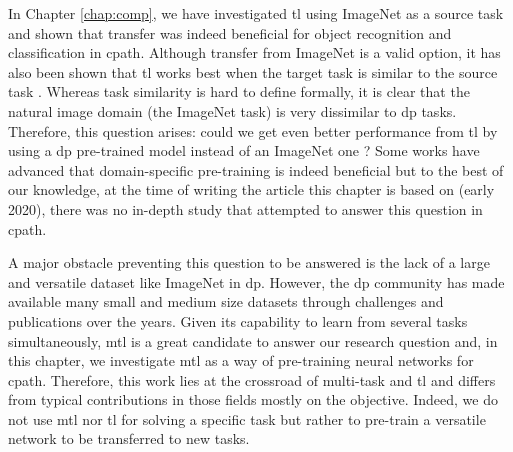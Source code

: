 
In Chapter \ref{chap:comp}, we have investigated \acrlong{tl} using ImageNet \cite{deng2009imagenet} as a source task and shown that transfer was indeed beneficial for object recognition and classification in \acrlong{cpath}. Although transfer from ImageNet is a valid option, it has also been shown that \acrlong{tl} works best when the target task is similar to the source task \cite{yosinski2014transferable,mensink2021factors}. Whereas task similarity is hard to define formally, it is clear that the natural image domain (\ie the ImageNet task) is very dissimilar to \acrlong{dp} tasks. Therefore, this question arises: could we get even better performance from \acrlong{tl} by using a \acrlong{dp} pre-trained model instead of an ImageNet one ? Some works \cite{khan2019improving, medela2019few, kraus2017automated, shang2019and} have advanced that domain-specific pre-training is indeed beneficial but to the best of our knowledge, at the time of writing the article this chapter is based on (early 2020), there was no in-depth study that attempted to answer this question in \acrlong{cpath}. 

A major obstacle preventing this question to be answered is the lack of a large and versatile dataset like ImageNet in \acrlong{dp}. However, the \acrlong{dp} community has made available many small and medium size datasets through challenges and publications over the years. Given its capability to learn from several tasks simultaneously, \acrlong{mtl} is a great candidate to answer our research question and, in this chapter, we investigate \acrshort{mtl} as a way of pre-training neural networks for \acrlong{cpath}. Therefore, this work lies at the crossroad of multi-task and \acrlong{tl} and differs from typical contributions in those fields mostly on the objective. Indeed, we do not use \acrshort{mtl} nor \acrlong{tl} for solving a specific task but rather to pre-train a versatile network to be transferred to new tasks. 

